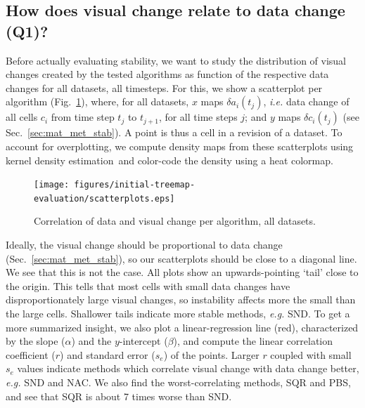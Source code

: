 \subsection{How does visual change relate to data change (Q1)?}
\label{sec:q1}
%
%
Before actually evaluating stability, we want to study the distribution of visual changes created by the tested algorithms as function of the respective data changes for all datasets, all timesteps. For this, we show a scatterplot per algorithm (Fig.~\ref{fig:scatterplot}), where, for all datasets, $x$ maps $\delta a_i(t_j)$, \emph{i.e.} data change of all cells $c_i$ from time step $t_j$ to $t_{j+1}$, for all time steps $j$; and $y$ maps $\delta c_i(t_j)$ (see Sec.~\ref{sec:mat_met_stab}). A point is thus a cell in a revision of a dataset. To account for overplotting, we compute density maps from these scatterplots using kernel density estimation\,\citep{kde} and color-code the density using a heat colormap.
%
\begin{figure}[htbp!]
\centering
\texttt{[image: figures/initial-treemap-evaluation/scatterplots.eps]}
\vspace{-0.2cm}
\caption{Correlation of data and visual change per algorithm, all datasets.}
\vspace{-0.1cm}
\label{fig:scatterplot}
\end{figure}
%
Ideally, the visual change should be proportional to data change (Sec.~\ref{sec:mat_met_stab}), so our scatterplots should be close to a diagonal line. We see that this is not the case. All plots show an upwards-pointing `tail' close to the origin. This tells that most cells with small data changes have disproportionately large visual changes, so instability affects more the small than the large cells. Shallower tails indicate more stable methods, \emph{e.g.} SND. To get a more summarized insight, we also plot a linear-regression line (red), characterized by the slope ($\alpha$) and the $y$-intercept ($\beta$), and compute the linear correlation coefficient ($r$) and standard error ($s_e$) of the points. Larger $r$ coupled with small $s_e$ values indicate methods which correlate visual change with data change better, \emph{e.g.} SND and NAC. We also find the worst-correlating methods, SQR and PBS, and see that SQR is about 7 times worse than SND.

